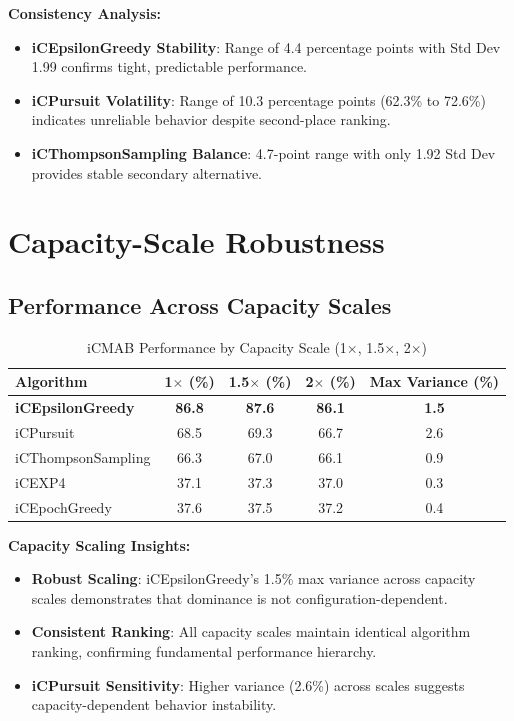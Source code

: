 \documentclass[12pt,a4paper]{article}
\newcommand{\primarytext}[1]{\textcolor{primaryblue}{\textbf{#1}}}
\newcommand{\secondarytext}[1]{\textcolor{secondaryblue}{\textbf{#1}}}
\newcommand{\success}[1]{\textcolor{accentgreen}{\textbf{#1}}}
\newcommand{\warning}[1]{\textcolor{warningred}{\textbf{#1}}}
\begin{document}
\textbf{Consistency Analysis:}
\begin{itemize}
\item \success{iCEpsilonGreedy Stability}: Range of 4.4 percentage points with Std Dev 1.99 confirms tight, predictable performance.
\item \warning{iCPursuit Volatility}: Range of 10.3 percentage points (62.3\% to 72.6\%) indicates unreliable behavior despite second-place ranking.
\item \secondarytext{iCThompsonSampling Balance}: 4.7-point range with only 1.92 Std Dev provides stable secondary alternative.
\end{itemize}

\section{Capacity-Scale Robustness}

\subsection{Performance Across Capacity Scales}

\begin{table}[H]
\centering
\caption{iCMAB Performance by Capacity Scale (1$\times$, 1.5$\times$, 2$\times$)}
\label{tab:capacity-scale}
\begin{tabular}{@{}lcccc@{}}
\toprule
\textbf{Algorithm} & \textbf{1$\times$ (\%)} & \textbf{1.5$\times$ (\%)} & \textbf{2$\times$ (\%)} & \textbf{Max Variance (\%)} \\
\midrule
\primarytext{iCEpsilonGreedy}   & \primarytext{86.8} & \primarytext{87.6} & \primarytext{86.1} & \primarytext{1.5} \\
iCPursuit                       & 68.5 & 69.3 & 66.7 & 2.6 \\
iCThompsonSampling              & 66.3 & 67.0 & 66.1 & 0.9 \\
iCEXP4                          & 37.1 & 37.3 & 37.0 & 0.3 \\
iCEpochGreedy                   & 37.6 & 37.5 & 37.2 & 0.4 \\
\bottomrule
\end{tabular}
\end{table}

\textbf{Capacity Scaling Insights:}
\begin{itemize}
\item \primarytext{Robust Scaling}: iCEpsilonGreedy's 1.5\% max variance across capacity scales demonstrates that dominance is not configuration-dependent.
\item \secondarytext{Consistent Ranking}: All capacity scales maintain identical algorithm ranking, confirming fundamental performance hierarchy.
\item \warning{iCPursuit Sensitivity}: Higher variance (2.6\%) across scales suggests capacity-dependent behavior instability.
\end{itemize}
\end{document}
